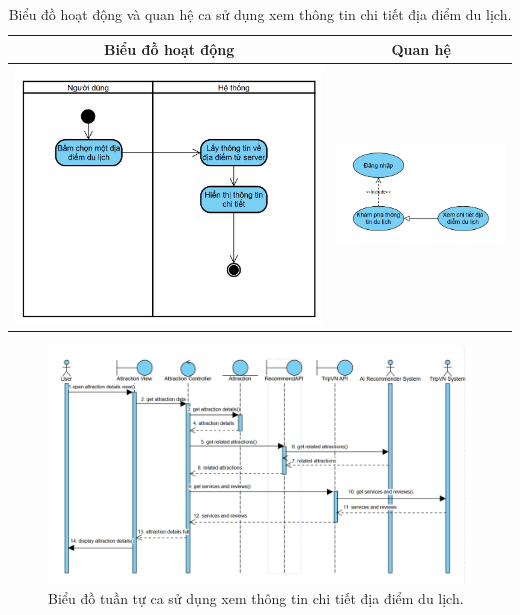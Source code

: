 \begin{table}[H] %
    \centering
    \caption{Biểu đồ hoạt động và quan hệ ca sử dụng xem thông tin chi tiết địa điểm du lịch.} %
    \label{tab:uc_view_place_details_diagrams} %
    \begin{tabular}{| c | c |}
        \hline
        \textbf{Biểu đồ hoạt động} & \textbf{Quan hệ} \\
        \hline
        \includegraphics[width=0.5\linewidth]{figures/c3/3-3-8-ad.png} %
        &
        \includegraphics[width=0.45\linewidth]{figures/c3/3-3-8-rd.png} \\ %
        \hline
    \end{tabular}
\end{table}

\begin{figure}[H]
    \centering
    \includegraphics[width=1\textwidth]{figures/c3/3-3-8-sd.png} %
    \caption{Biểu đồ tuần tự ca sử dụng xem thông tin chi tiết địa điểm du lịch.}
    \label{fig:3-3-8-sequence-diagram}
\end{figure}